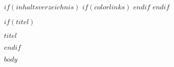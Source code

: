 \documentclass{\VorlagenPfad/coderdojokatext}
\begin{document}
$if(inhaltsverzeichnis)$
{
$if(colorlinks)$
\hypersetup{linkcolor=$if(toccolor)$$toccolor$$else$black$endif$}
$endif$
\setcounter{tocdepth}{$toc-depth$}
\tableofcontents
\pagebreak
}
$endif$



$if(titel)$
\begin{center}
	{\huge $titel$}
\end{center}
$endif$

$body$
\end{document}
